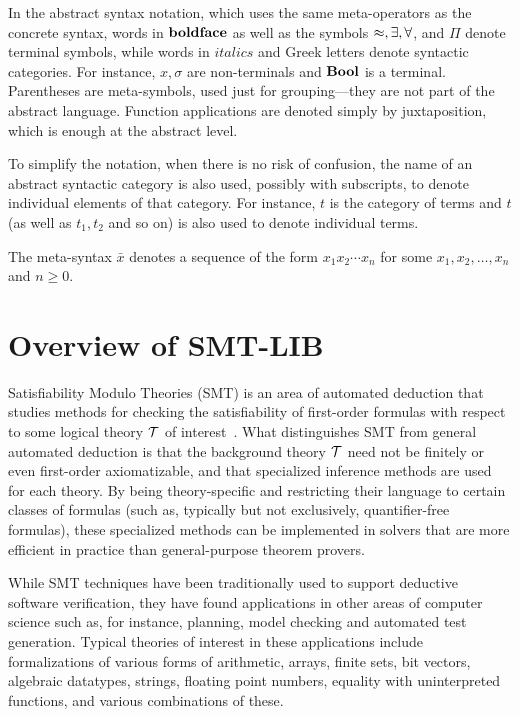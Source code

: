 In the abstract syntax notation,
which uses the same meta-operators as the concrete syntax,
words in $\textbf{boldface}$ as well as the symbols $\approx, \exists, \forall$, 
and $\Pi$ denote terminal symbols,
while words in $\mathit{italics}$ and Greek letters denote 
syntactic categories.
For instance, $x, \sigma$ are non-terminals and $\textbf{Bool}$ is a terminal.
Parentheses are meta-symbols, used just for grouping---they are not part
of the abstract language.
Function applications are denoted simply by juxtaposition, 
which is enough at the abstract level.

To simplify the notation, 
when there is no risk of confusion,
the name of an abstract syntactic category is also used,
possibly with subscripts, to denote individual elements of that category.
For instance, $t$ is the category of terms
and $t$ (as well as $t_1, t_2$ and so on) is also used to denote individual terms. 

The meta-syntax $\bar{x}$ denotes a sequence of the form $x_1 x_2 \cdots x_n$
for some $x_1, x_2, \ldots, x_n$ and $n \geq 0$.


\section{Overview of SMT-LIB}

Satisfiability Modulo Theories (SMT) is an area of automated deduction 
that studies methods for checking the satisfiability of first-order formulas 
with respect to some logical theory $\mathcal{T}$ of interest~\cite{BarSST-09}.
What distinguishes SMT from general automated 
deduction is that the background theory $\mathcal{T}$ need not be finitely or even first-order 
axiomatizable, and that specialized inference methods are used for each theory. 
By being theory-specific and restricting their language to certain classes 
of formulas (such as, typically but not exclusively, quantifier-free formulas), 
these specialized methods can be implemented in solvers 
that are more efficient in practice than general-purpose theorem provers. 

While SMT techniques have been traditionally 
used to support deductive software verification, they have found applications 
in other areas of computer science such as, for instance, planning, model checking and 
automated test generation. 
Typical theories of interest in these applications
include formalizations of various forms of arithmetic, arrays, finite sets, 
bit vectors, algebraic datatypes, strings, floating point numbers,
equality with uninterpreted functions, and various combinations of these.


